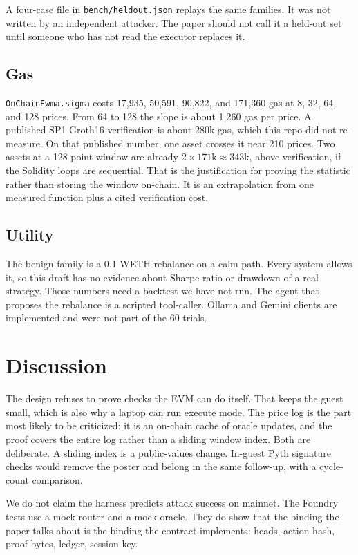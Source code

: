 \documentclass[11pt]{article}
\begin{document}
A four-case file in \texttt{bench/heldout.json} replays the same families. It was not written by an independent attacker. The paper should not call it a held-out set until someone who has not read the executor replaces it.

\subsection{Gas}

\texttt{OnChainEwma.sigma} costs 17{,}935, 50{,}591, 90{,}822, and 171{,}360 gas at 8, 32, 64, and 128 prices. From 64 to 128 the slope is about 1{,}260 gas per price. A published SP1 Groth16 verification is about 280k gas, which this repo did not re-measure. On that published number, one asset crosses it near 210 prices. Two assets at a 128-point window are already $2 \times 171\mathrm{k} \approx 343\mathrm{k}$, above verification, if the Solidity loops are sequential. That is the justification for proving the statistic rather than storing the window on-chain. It is an extrapolation from one measured function plus a cited verification cost.

\subsection{Utility}

The benign family is a 0.1 WETH rebalance on a calm path. Every system allows it, so this draft has no evidence about Sharpe ratio or drawdown of a real strategy. Those numbers need a backtest we have not run. The agent that proposes the rebalance is a scripted tool-caller. Ollama and Gemini clients are implemented and were not part of the 60 trials.

\section{Discussion}

The design refuses to prove checks the EVM can do itself. That keeps the guest small, which is also why a laptop can run execute mode. The price log is the part most likely to be criticized: it is an on-chain cache of oracle updates, and the proof covers the entire log rather than a sliding window index. Both are deliberate. A sliding index is a public-values change. In-guest Pyth signature checks would remove the poster and belong in the same follow-up, with a cycle-count comparison.

We do not claim the harness predicts attack success on mainnet. The Foundry tests use a mock router and a mock oracle. They do show that the binding the paper talks about is the binding the contract implements: heads, action hash, proof bytes, ledger, session key.
\end{document}
